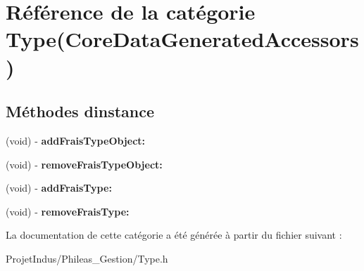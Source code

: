 \hypertarget{category_type_07_core_data_generated_accessors_08}{}\section{Référence de la catégorie Type(Core\+Data\+Generated\+Accessors)}
\label{category_type_07_core_data_generated_accessors_08}
\subsection*{Méthodes d\textquotesingle{}instance}
\begin{DoxyCompactItemize}
\item 
\hypertarget{category_type_07_core_data_generated_accessors_08_a4cedaf21b6d42062da5c02528f242f36}{}(void) -\/ {\bfseries add\+Frais\+Type\+Object\+:}\label{category_type_07_core_data_generated_accessors_08_a4cedaf21b6d42062da5c02528f242f36}

\item 
\hypertarget{category_type_07_core_data_generated_accessors_08_a3e6ca8ffbe4d074e0d5a0017dea982b3}{}(void) -\/ {\bfseries remove\+Frais\+Type\+Object\+:}\label{category_type_07_core_data_generated_accessors_08_a3e6ca8ffbe4d074e0d5a0017dea982b3}

\item 
\hypertarget{category_type_07_core_data_generated_accessors_08_a56ba34766482e49edff2f87f00ca09f8}{}(void) -\/ {\bfseries add\+Frais\+Type\+:}\label{category_type_07_core_data_generated_accessors_08_a56ba34766482e49edff2f87f00ca09f8}

\item 
\hypertarget{category_type_07_core_data_generated_accessors_08_a9a402f4b6a35306c879847e8bf014888}{}(void) -\/ {\bfseries remove\+Frais\+Type\+:}\label{category_type_07_core_data_generated_accessors_08_a9a402f4b6a35306c879847e8bf014888}

\end{DoxyCompactItemize}


La documentation de cette catégorie a été générée à partir du fichier suivant \+:\begin{DoxyCompactItemize}
\item 
Projet\+Indus/\+Phileas\+\_\+\+Gestion/Type.\+h\end{DoxyCompactItemize}
